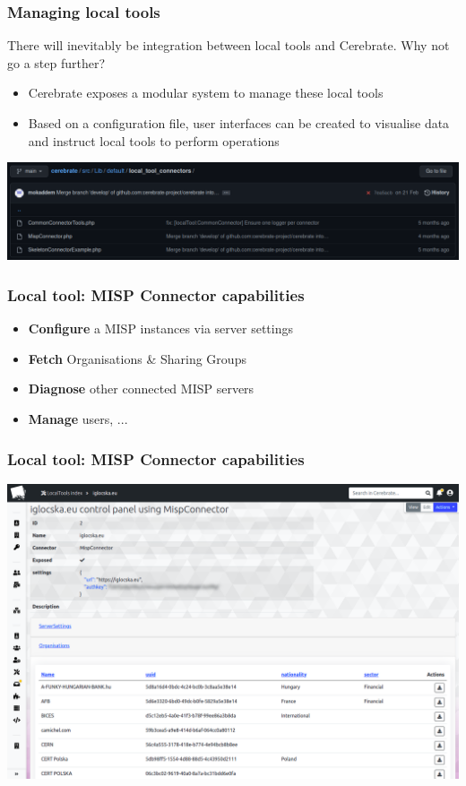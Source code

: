 \begin{frame}
\frametitle{Managing local tools}
There will inevitably be integration between local tools and Cerebrate. Why not go a step further?
    \begin{itemize}
        \item Cerebrate exposes a modular system to manage these local tools
        \item Based on a configuration file, user interfaces can be created to visualise data and instruct local tools to perform operations
    \end{itemize}
    \begin{center}
        \includegraphics[width=0.9\linewidth]{pictures/github-local-tool.png}
    \end{center}
\end{frame}

\begin{frame}
\frametitle{Local tool: MISP Connector capabilities}
    \begin{itemize}
        \item \textbf{Configure} a MISP instances via server settings
        \item \textbf{Fetch} Organisations \& Sharing Groups
        \item \textbf{Diagnose} other connected MISP servers
        \item \textbf{Manage} users, ...
    \end{itemize}
\end{frame}

\begin{frame}
\frametitle{Local tool: MISP Connector capabilities}
    \begin{center}
        \includegraphics[width=0.97\linewidth]{pictures/localtool-view.png}
    \end{center}
\end{frame}

